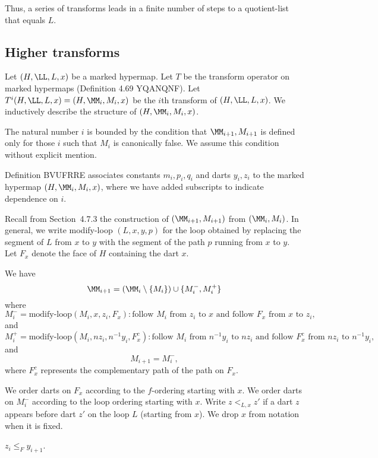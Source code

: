 Thus, a series of transforms leads in a finite number of steps to a quotient-list that equals $L$.


\subsection{Higher transforms}


Let $(H,\LL,L,x)$ be a marked hypermap.  
Let $T$ be the transform operator on marked hypermaps
(Definition 4.69 YQANQNF).  
Let $T^i(H,\LL,L,x) = (H,\MM_i,M_i,x)$ be the $i$th transform of
$(H,\LL,L,x)$.  We inductively describe the structure of $(H,\MM_i,M_i,x)$.

The natural number $i$ is bounded by the condition that $\MM_{i+1},M_{i+1}$ is defined only for those $i$ such that $M_i$ is canonically false.
We assume this condition without explicit mention.

Definition BVUFRRE associates constants $m_i,p_i,q_i$ and darts $y_i,z_i$
to the marked hypermap $(H,\MM_i,M_i,x)$, where we have added
subscripts to indicate dependence on $i$.


Recall from Section~4.7.3 the construction of $(\MM_{i+1},M_{i+1})$
from $(\MM_i,M_i)$. 
In general, we write modify-loop $(L,x,y,p)$ for the loop obtained
by replacing the segment of $L$ from $x$ to $y$ with the segment
of the path $p$ running from $x$ to $y$.
Let $F_x$ denote the face of $H$ containing the dart $x$. 

\begin{lemma} 
We have 
\[
\MM_{i+1} = (\MM_i \setminus \{M_i\}) \cup \{M_i^-,M_i^+\}
\]
where 
\[
M_i^- = \text{modify-loop} (M_i,x,z_i,F_x): 
  \text{follow } M_i \text{ from } z_i \text{ to } x
  \text{ and follow } F_x \text{ from } x \text{ to } z_i,
\]
and
\[
M_i^+ = \text{modify-loop} (M_i,nz_i,n^{-1}y_i,F^c_x): 
\text{follow } M_i \text{ from } n^{-1} y_i \text{ to } n z_i
  \text{ and follow } F^c_x \text{ from } nz_i \text{ to } n^{-1} y_i,
\]
and 
\[
M_{i+1} = M_i^-,
\]
where $F^c_x$ represents the complementary path of the path on $F_x$.
\end{lemma} 

We order darts on $F_x$ according to the $f$-ordering starting with $x$.
We order darts on $M_i^-$ 
according to the loop ordering starting with $x$.
Write $z <_{L,x} z'$ if a dart $z$ appears before dart $z'$ on the loop $L$
(starting from $x$).  We drop $x$ from notation when it is fixed.

\begin{lemma}  $z_i \le _F y_{i+1}$.
\end{lemma} 

